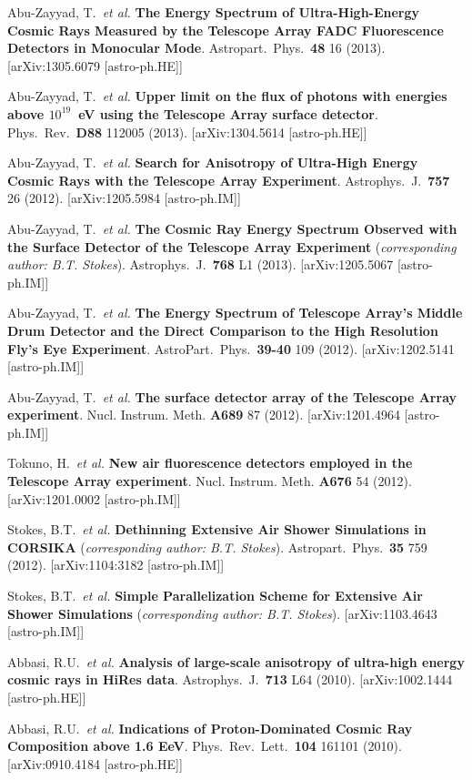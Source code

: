 \begin{resume}
Abu-Zayyad, T.\ {\it et al.} {\bf The Energy Spectrum of Ultra-High-Energy Cosmic Rays Measured by the Telescope Array FADC Fluorescence Detectors in Monocular Mode}. Astropart.\ Phys.\ {\bf 48} 16 (2013). [arXiv:1305.6079 [astro-ph.HE]]

\newpage

Abu-Zayyad, T.\ {\it et al.} {\bf Upper limit on the flux of photons with energies above \boldmath$10^{19}$~eV using the Telescope Array surface detector}. Phys.\ Rev.\ {\bf D88} 112005 (2013). [arXiv:1304.5614 [astro-ph.HE]]  

Abu-Zayyad, T.\ {\it et al.} {\bf Search for Anisotropy of Ultra-High Energy Cosmic Rays with the Telescope Array Experiment}. Astrophys.\ J.\ {\bf 757} 26 (2012).  [arXiv:1205.5984 [astro-ph.IM]]

Abu-Zayyad, T.\ {\it et al.} {\bf The Cosmic Ray Energy Spectrum Observed with the Surface Detector of the Telescope Array Experiment} ({\it corresponding author: B.T. Stokes}). Astrophys.\ J.\ {\bf 768} L1 (2013). [arXiv:1205.5067 [astro-ph.IM]]

Abu-Zayyad, T.\ {\it et al.} {\bf The Energy Spectrum of Telescope Array's Middle Drum Detector and the Direct Comparison to the High Resolution Fly's Eye Experiment}. AstroPart.\ Phys.\ {\bf 39-40} 109 (2012). [arXiv:1202.5141 [astro-ph.IM]]

Abu-Zayyad, T.\ {\it et al.} {\bf The surface detector array of the Telescope Array experiment}. Nucl. Instrum. Meth. {\bf A689} 87 (2012). [arXiv:1201.4964 [astro-ph.IM]]

Tokuno, H.\ {\it et al.} {\bf New air fluorescence detectors employed in the Telescope Array experiment}. Nucl. Instrum. Meth. {\bf A676} 54 (2012). [arXiv:1201.0002 [astro-ph.IM]] 

Stokes, B.T.\ {\it et al.} {\bf Dethinning Extensive Air Shower Simulations in CORSIKA} ({\it corresponding author: B.T. Stokes}). Astropart.\ Phys.\ {\bf 35} 759 (2012). [arXiv:1104:3182 [astro-ph.IM]]

Stokes, B.T.\ {\it et al.} {\bf Simple Parallelization Scheme for Extensive Air Shower Simulations} ({\it corresponding author: B.T. Stokes}). [arXiv:1103.4643 [astro-ph.IM]]

Abbasi, R.U.\ {\it et al.} {\bf Analysis of large-scale anisotropy of ultra-high energy cosmic rays in HiRes data}. Astrophys.\ J.\ {\bf 713} L64 (2010). [arXiv:1002.1444 [astro-ph.HE]]

Abbasi, R.U.\ {\it et al.} {\bf Indications of Proton-Dominated Cosmic Ray Composition above 1.6 EeV}. Phys.\ Rev.\ Lett.\ {\bf 104} 161101 (2010). [arXiv:0910.4184 [astro-ph.HE]]


\end{resume}
